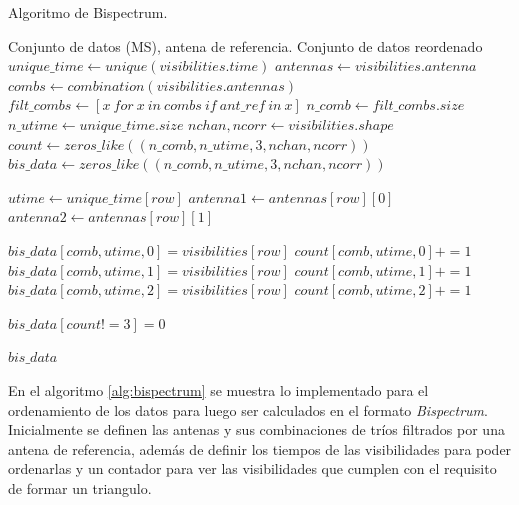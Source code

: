 \begin{algorithm}[!ht]
	\caption{Algoritmo de Bispectrum.}
	\label{alg:bispectrum}
	\begin{algorithmic}[1]
    \REQUIRE Conjunto de datos (MS), antena de referencia.
    \ENSURE Conjunto de datos reordenado	
    \STATE $unique\_time \gets unique(visibilities.time)$
    \STATE $antennas \gets visibilities.antenna$
    \STATE $combs \gets combination(visibilities.antennas)$
    \STATE $filt\_combs \gets [x\ for\ x\ in\ combs\ if\ ant\_ref\ in\ x]$
    \STATE $n\_comb \gets filt\_combs.size$
    \STATE $n\_utime \gets unique\_time.size$
    \STATE $nchan, ncorr \gets visibilities.shape$
    \STATE $count  \gets zeros\_like((n\_comb, n\_utime, 3, nchan, ncorr))$
    \STATE $bis\_data \gets zeros\_like((n\_comb, n\_utime, 3, nchan, ncorr))$


        \STATE $utime \gets unique\_time[row]$
        \STATE $antenna1 \gets antennas[row][0]$
        \STATE $antenna2 \gets antennas[row][1]$

            \STATE $bis\_data[comb, utime, 0] = visibilities[row] $
            \STATE $count[comb, utime, 0] += 1 $
            \STATE $bis\_data[comb, utime, 1] = visibilities[row] $
            \STATE $count[comb, utime, 1] += 1 $
            \STATE $bis\_data[comb, utime, 2] = visibilities[row] $
            \STATE $count[comb, utime, 2] +=  1$
        \ENDIF
    \ENDFOR

    \ENDFOR

    \STATE $bis\_data[count != 3] = 0$
    
    \RETURN $bis\_data$
	
	\end{algorithmic}
\end{algorithm}

En el algoritmo \ref{alg:bispectrum} se muestra lo implementado para el ordenamiento de los datos para luego ser calculados en el formato \textit{Bispectrum}. Inicialmente se definen las antenas y sus combinaciones de tríos filtrados por una antena de referencia, además de definir los tiempos de las visibilidades para poder ordenarlas y un contador para ver las visibilidades que cumplen con el requisito de formar un triangulo. 

